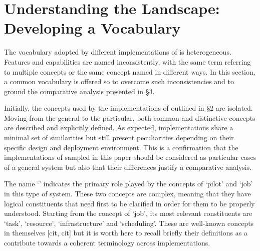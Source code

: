\documentclass{sig-alternate}
\begin{document}


\section{Understanding the Landscape: Developing a Vocabulary}
\label{sec:vocab}


The vocabulary adopted by different implementations of \pilotjob is heterogeneous. Features and capabilities are named inconsistently, with the same term referring to multiple concepts or the same concept named in different ways. In this section, a common vocabulary is offered so to overcome such inconsistencies and to ground the comparative analysis presented in \S 4.


Initially, the concepts used by the implementations of \pilotjob outlined in \S 2 are isolated. Moving from the general to the particular, both common and distinctive concepts are described and explicitly defined. As expected, \pilotjob implementations share a minimal set of similarities but still present peculiarities depending on their specific design and deployment environment. This is a confirmation that the implementations of \pilotjob sampled in this paper should be considered as particular cases of a general \pilotjob system but also that their differences justify a comparative analysis.


The name `\pilotjob' indicates the primary role played by the concepts of `pilot' and `job' in this type of system. These two concepts are complex, meaning that they have logical constituents that need first to be clarified in order for them to be properly understood. Starting from the concept of `job', its most relevant constituents are `task', `resource', `infrastructure' and `scheduling'. These are well-known concepts in themselves [cit, cit] but it is worth here to recall briefly their definitions as a contribute towards a coherent terminology across \pilotjobs implementations. 
\end{document}
